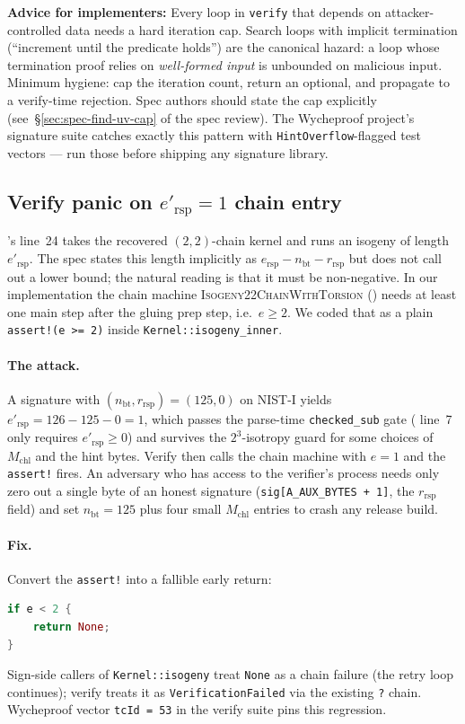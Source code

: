 \noindent
\textbf{Advice for implementers:} Every loop in
\texttt{verify} that depends on attacker-controlled data needs
a hard iteration cap.  Search loops with implicit termination
(``increment until the predicate holds'') are the canonical
hazard: a loop whose termination proof relies on
\textit{well-formed input} is unbounded on malicious input.
Minimum hygiene: cap the iteration count, return an optional,
and propagate to a verify-time rejection.  Spec authors should
state the cap explicitly (see~\S\ref{sec:spec-find-uv-cap}
of the spec review).  The Wycheproof project's signature suite
catches exactly this pattern with \texttt{HintOverflow}-flagged
test vectors --- run those before shipping any signature
library.

\subsection{Verify panic on $e'_{\mathrm{rsp}} = 1$ chain entry}
\label{sec:bug-e-rsp-prime-one-assert}

's line~24 takes the recovered $(2,2)$-chain kernel
and runs an isogeny of length $e'_{\mathrm{rsp}}$.  The spec
states this length implicitly as $e_{\mathrm{rsp}} -
n_{\mathrm{bt}} - r_{\mathrm{rsp}}$ but does not call out a
lower bound; the natural reading is that it must be
non-negative.  In our implementation the chain machine
\textsc{Isogeny22ChainWithTorsion} () needs at
least one main step after the gluing prep step, i.e.\
$e \geq 2$.  We coded that as a plain
\texttt{assert!(e >= 2)} inside
\texttt{Kernel::isogeny\_inner}.

\paragraph{The attack.}  A signature with
$(n_{\mathrm{bt}}, r_{\mathrm{rsp}}) = (125, 0)$ on NIST-I
yields $e'_{\mathrm{rsp}} = 126 - 125 - 0 = 1$, which passes
the parse-time \texttt{checked\_sub} gate
( line~7 only requires
$e'_{\mathrm{rsp}} \geq 0$) and survives the
$2^3$-isotropy guard for some choices of $M_{\mathrm{chl}}$
and the hint bytes.  Verify then calls the chain machine
with $e = 1$ and the \texttt{assert!} fires.  An adversary
who has access to the verifier's process needs only zero
out a single byte of an honest signature
(\texttt{sig[A\_AUX\_BYTES + 1]}, the $r_{\mathrm{rsp}}$
field) and set $n_{\mathrm{bt}} = 125$ plus four small
$M_{\mathrm{chl}}$ entries to crash any release build.

\paragraph{Fix.}  Convert the \texttt{assert!} into a
fallible early return:
\begin{lstlisting}[language=Rust]
if e < 2 {
    return None;
}
\end{lstlisting}
Sign-side callers of \texttt{Kernel::isogeny} treat
\texttt{None} as a chain failure (the retry loop continues);
verify treats it as \texttt{VerificationFailed} via the
existing \texttt{?} chain.  Wycheproof vector
\texttt{tcId = 53} in the verify suite pins this regression.

